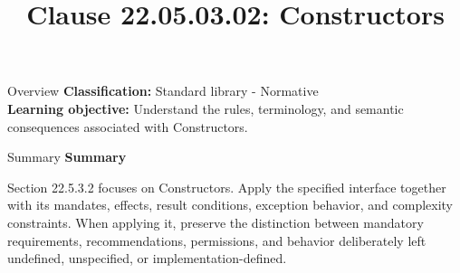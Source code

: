 \documentclass[10pt,letterpaper]{article}
\title{Clause 22.05.03.02: Constructors}
\author{}
\date{}
\begin{document}
\maketitle
\begin{CornellOverviewBox}{Overview}
\textbf{Classification:} Standard library - Normative\\[2pt]
\textbf{Learning objective:} Understand the rules, terminology, and semantic consequences associated with Constructors.
\end{CornellOverviewBox}\begin{CornellSummaryBox}{Summary}
{\sffamily\bfseries\color{Accent} Summary}\par\vspace{3pt}Section 22.5.3.2 focuses on Constructors. Apply the specified interface together with its mandates, effects, result conditions, exception behavior, and complexity constraints. When applying it, preserve the distinction between mandatory requirements, recommendations, permissions, and behavior deliberately left undefined, unspecified, or implementation-defined.
\end{CornellSummaryBox}
\end{document}
